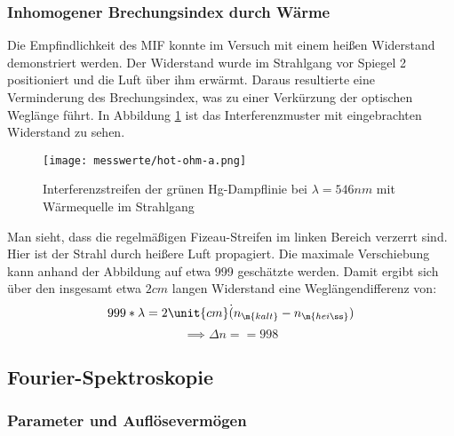 {		%


		\subsubsection{Inhomogener Brechungsindex durch Wärme} %
		\label{ssub:inhomogener_brechungsindex_durch_w_rme}
			
			Die Empfindlichkeit des MIF konnte im Versuch mit einem heißen Widerstand demonstriert werden.
			Der Widerstand wurde im Strahlgang vor Spiegel 2 positioniert und die Luft über ihm erwärmt.
			Daraus resultierte eine Verminderung des Brechungsindex, was zu einer Verkürzung der optischen Weglänge führt.
			In Abbildung \ref{fig:hot ohm} ist das Interferenzmuster mit eingebrachten Widerstand zu sehen.

			\begin{figure}[htb]
				\centering
				\texttt{[image: messwerte/hot-ohm-a.png]}
				\caption{Interferenzstreifen der grünen Hg-Dampflinie bei $\lambda = 546 \unit{nm}$ mit Wärmequelle im Strahlgang}
				\label{fig:hot ohm}
			\end{figure}

			Man sieht, dass die regelmäßigen Fizeau-Streifen im linken Bereich verzerrt sind.
			Hier ist der Strahl durch heißere Luft propagiert.
			Die maximale Verschiebung kann anhand der Abbildung auf etwa 999 geschätzte werden.
			Damit ergibt sich über den insgesamt etwa $2 \unit{cm} $ langen Widerstand eine Weglängendifferenz von:
			\[ 999 * \lambda = 2 \unit{cm} \dot (n_\m{kalt} - n_\m{heiß}) \]
			\[ \implies \Delta n == 998 \]




	\subsection{Fourier-Spektroskopie} %
	\label{sub:fourier_spektroskopie}

		\subsubsection{Parameter und Auflösevermögen} %
		\label{ssub:parameter_und_aufl_severm_gen}

			\begin{figure}[htb]
				\centering
				
				\caption{}
				\label{fig:}
			\end{figure}
		
}
